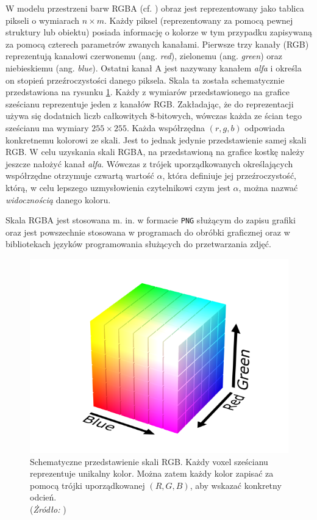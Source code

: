 W modelu przestrzeni barw RGBA (cf. \cite{RGBASpecification}) obraz jest reprezentowany jako tablica pikseli o wymiarach $n \times m$. Każdy piksel (reprezentowany za pomocą pewnej struktury lub obiektu) posiada informację o kolorze w tym przypadku zapisywaną za pomocą czterech parametrów zwanych kanałami. Pierwsze trzy kanały (RGB) reprezentują kanałowi czerwonemu (ang. \textit{red}), zielonemu (ang. \textit{green}) oraz niebieskiemu (ang. \textit{blue}). Ostatni kanał A jest nazywany kanałem \textit{alfa} i określa on stopień przeźroczystości danego piksela. Skala ta została schematycznie przedstawiona na rysunku \ref{fig:rgb_cube}. Każdy z wymiarów przedstawionego na grafice sześcianu reprezentuje jeden z kanałów RGB. Zakładając, że do reprezentacji używa się dodatnich liczb całkowitych 8-bitowych, wówczas każda ze ścian tego sześcianu ma wymiary $255 \times 255$. Każda współrzędna $(r, g, b)$ odpowiada konkretnemu kolorowi ze skali. Jest to jednak jedynie przedstawienie samej skali RGB. W celu uzyskania skali RGBA, na przedstawioną na grafice kostkę należy jeszcze nałożyć kanał \textit{alfa}. Wówczas z trójek uporządkowanych określających współrzędne otrzymuje czwartą wartość $\alpha$, która definiuje jej przeźroczystość, którą, w celu lepszego uzmysłowienia czytelnikowi czym jest $\alpha$, można nazwać \textit{widocznością} danego koloru.

Skala RGBA jest stosowana m. in. w formacie \texttt{PNG} służącym do zapisu grafiki oraz jest powszechnie stosowana w programach do obróbki graficznej oraz w bibliotekach języków programowania służących do przetwarzania zdjęć.

\begin{figure}
    \centering
    \includegraphics[scale=1.8]{images/other/RGB_color_small.png}
    \caption{
        Schematyczne przedstawienie skali RGB. Każdy voxel sześcianu reprezentuje unikalny kolor. Można zatem każdy kolor zapisać za pomocą trójki uporządkowanej $(R, G, B)$, aby wskazać konkretny odcień. \\ 
        (\textit{Żródło:} \cite{RGBCube})
    }
    \label{fig:rgb_cube}
\end{figure}


